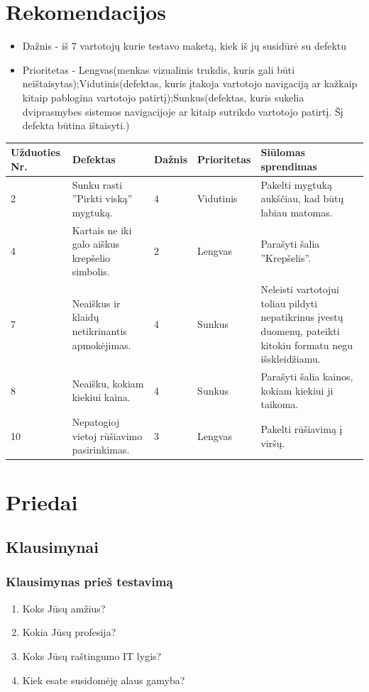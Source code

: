 \documentclass[oneside]{VUMIFPSkursinis}
\begin{document}
\section{Rekomendacijos}
\begin{itemize}
	\item{Dažnis - iš 7 vartotojų kurie testavo maketą, kiek iš jų susidūrė su defektu}
	\item{Prioritetas - Lengvas(menkas vizualinis trukdis, kuris gali būti neištaisytas);Vidutinis(defektas, kuris įtakoja vartotojo navigaciją ar kažkaip kitaip pablogina vartotojo patirtį);Sunkus(defektas, kuris sukelia dviprasmybes sistemos navigacijoje ar kitaip sutrikdo vartotojo patirtį. Šį defekta būtina ištaisyti.)}
\end{itemize}
\begin{center}
    \begin{tabular}{ |p{2cm}| p{4cm} | p{2cm} | p{2cm} | p{5cm} |}
    \hline
	Užduoties Nr.&Defektas&Dažnis&Prioritetas&Siūlomas sprendimas\\ \hline
	2&Sunku rasti ''Pirkti viską'' mygtuką.&4&Vidutinis&Pakelti mygtuką aukščiau, kad būtų labiau matomas. \\ \hline
	4&Kartais ne iki galo aiškus krepšelio simbolis.&2&Lengvas&Parašyti šalia ''Krepšelis''. \\ \hline
	7&Neaiškus ir klaidų netikrinantis apmokėjimas.&4&Sunkus&Neleisti vartotojui toliau pildyti nepatikrinus įvestų duomenų, pateikti kitokiu formatu negu išskleidžiamu. \\ \hline
	8&Neaišku, kokiam kiekiui kaina.&4&Sunkus&Parašyti šalia kainos, kokiam kiekiui ji taikoma. \\ \hline
	10&Nepatogioj vietoj rūšiavimo pasirinkimas.&3&Lengvas&Pakelti rūšiavimą į viršų. \\ \hline
   \hline
    \end{tabular}
\end{center}
\section{Priedai}
	\subsection{Klausimynai}
	\subsubsection{Klausimynas prieš testavimą}
	\begin{enumerate}
			\item{Koks Jūsų amžius?}
			\item{Kokia Jūsų profesija?}
			\item{Koks Jūsų raštingumo IT lygis?}
			\item{Kiek esate susidomėję alaus gamyba?}
	\end{enumerate}
\end{document}
